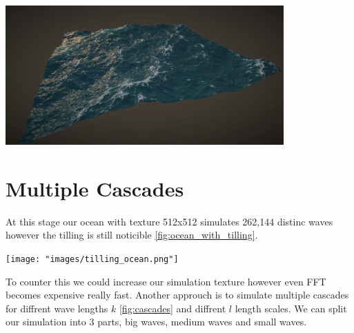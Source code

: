 \begin{minipage}{1\textwidth}
    \centering
    \includegraphics[width=0.8\textwidth]{"images/ocean_with_foam.png"}
    \label{fig:ocean_with_foam}
\end{minipage}

\section{Multiple Cascades}
At this stage our ocean with texture 512x512 simulates 262,144 distinc waves however the tilling is still noticible \ref{fig:ocean_with_tilling}.

\begin{minipage}{1\textwidth}
    \centering
    \texttt{[image: "images/tilling\_ocean.png"]}
    \label{fig:ocean_with_tilling}
\end{minipage}

To counter this we could increase our simulation texture however even FFT becomes expensive really fast.
Another approuch is to simulate multiple cascades for diffrent wave lengths $k$ \ref{fig:cascades} and diffrent $l$ length scales. We can split our simulation into 3 parts, big waves, medium waves and small waves.


